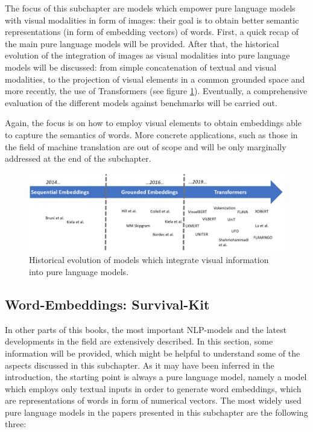 \documentclass[
]{krantz}
\begin{document}
The focus of this subchapter are models which empower pure language models with visual modalities in form of images: their goal is to obtain better semantic representations (in form of embedding vectors) of words. First, a quick recap of the main pure language models will be provided. After that, the historical evolution of the integration of images as visual modalities into pure language models will be discussed: from simple concatenation of textual and visual modalities, to the projection of visual elements in a common grounded space and more recently, the use of Transformers (see figure \ref{fig:img-hist}). Eventually, a comprehensive evaluation of the different models against benchmarks will be carried out.

Again, the focus is on how to employ visual elements to obtain embeddings able to capture the semantics of words. More concrete applications, such as those in the field of machine translation are out of scope and will be only marginally addressed at the end of the subchapter.

\begin{figure}

{\centering \includegraphics[width=1\linewidth]{figures/02-03-img-support-text/Img-Hist} 

}

\caption{Historical evolution of models which integrate visual information into pure language models.}\label{fig:img-hist}
\end{figure}

\hypertarget{word-embeddings-survival-kit}{%
\subsection{Word-Embeddings: Survival-Kit}\label{word-embeddings-survival-kit}}

In other parts of this books, the most important NLP-models and the latest developments in the field are extensively described. In this section, some information will be provided, which might be helpful to understand some of the aspects discussed in this subchapter. As it may have been inferred in the introduction, the starting point is always a pure language model, namely a model which employs only textual inputs in order to generate word embeddings, which are representations of words in form of numerical vectors.
The most widely used pure language models in the papers presented in this subchapter are the following three:
\end{document}
